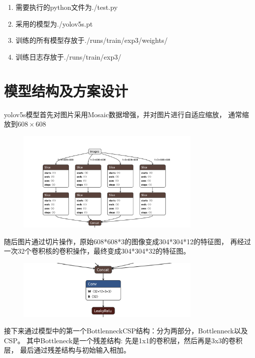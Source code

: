 \documentclass{article}
\begin{document}
\begin{enumerate}
    \item 需要执行的python文件为./test.py
    \item 采用的模型为./yolov5s.pt
    \item 训练的所有模型存放于./runs/train/exp3/weights/
    \item 训练日志存放于./runs/train/exp3/
\end{enumerate}


\section{模型结构及方案设计}

yolov5s模型首先对图片采用Mosaic数据增强，并对图片进行自适应缩放，
通常缩放到$608\times 608$

\begin{figure}[H]
    \centering
    \includegraphics[width=0.8\textwidth]{figures/yolov5-structure-1.png}
\end{figure}

随后图片通过切片操作，原始608*608*3的图像变成304*304*12的特征图，
再经过一次32个卷积核的卷积操作，最终变成304*304*32的特征图。

\begin{figure}[H]
    \centering
    \includegraphics[width=0.8\textwidth]{figures/yolov5-structure-2.png}
\end{figure}

接下来通过模型中的第一个BottlenneckCSP结构：分为两部分，Bottlenneck以及CSP。
其中Bottleneck是一个残差结构: 先是1x1的卷积层，然后再是3x3的卷积层，
最后通过残差结构与初始输入相加。
\end{document}
